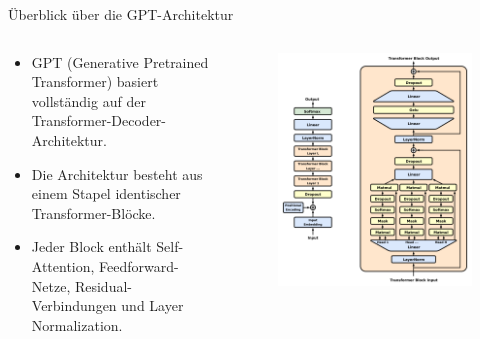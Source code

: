 \documentclass[aspectratio=1610, xcolor=dvipsnames, 9pt]{beamer}
\begin{document}
\begin{frame}{Überblick über die GPT-Architektur}
  \begin{columns}
    \begin{column}{0.5\textwidth}
      \begin{itemize}
        \item GPT (Generative Pretrained Transformer) basiert vollständig auf der Transformer-Decoder-Architektur.
        \item Die Architektur besteht aus einem Stapel identischer Transformer-Blöcke.
        \item Jeder Block enthält Self-Attention, Feedforward-Netze, Residual-Verbindungen und Layer Normalization.
      \end{itemize}
    \end{column}
    \begin{column}{0.5\textwidth}
      \begin{figure}
        \centering
        \includegraphics[width=0.8\columnwidth]{images/Full_GPT_architecture.png}
      \end{figure}
    \end{column}
  \end{columns}
\end{frame}
\end{document}
